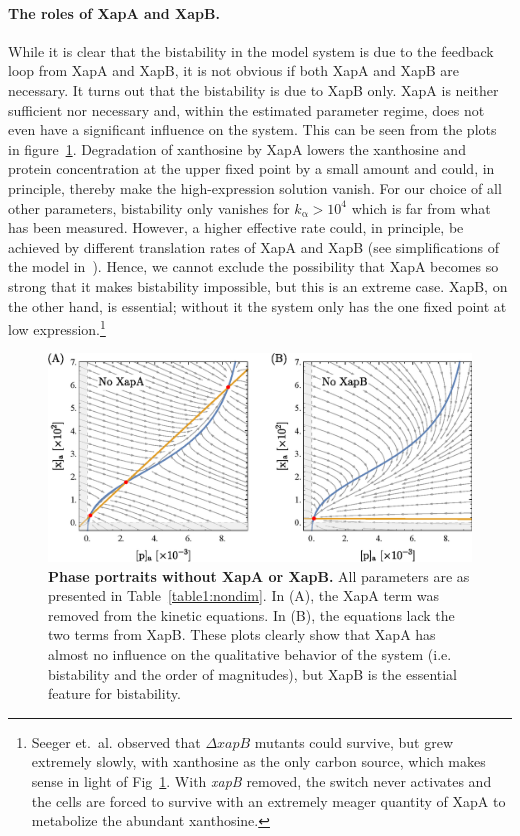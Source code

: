 \documentclass[10pt,letterpaper]{article}
\newcommand{\n}[1]{\mathrm{#1}}
\begin{document}
	\paragraph*{The roles of XapA and XapB.}
	While it is clear that the bistability in the model system is due to the
	feedback loop from XapA and XapB, it is not obvious if both XapA and XapB
	are necessary. It turns out that the bistability is due to XapB only. XapA
	is neither sufficient nor necessary and, within the estimated parameter
	regime, does not even have a significant influence on the system. This can
	be seen from the plots in figure~\ref{fig6:xapAB}.
	Degradation of xanthosine by XapA lowers the xanthosine and protein concentration at the upper
	fixed point by a small amount and could, in principle, thereby make the
	high-expression solution vanish. For our choice of all other parameters,
	bistability only vanishes for $k_{\n{\alpha}} > 10^4$ which is far from what has been
	measured. However, a higher effective rate could, in principle, be achieved by
	different translation rates of XapA and XapB (see simplifications of the
	model in~). Hence, we cannot exclude the possibility that
	XapA becomes so strong that it makes bistability impossible, but this is an
	extreme case. XapB, on the other hand, is essential; without it the system
	only has the one fixed point at low expression.\footnote{
		Seeger et.\ al.\cite{Seeger1995} observed that $\Delta xapB$ mutants could
		survive, but grew extremely slowly, with xanthosine as the only carbon
		source, which makes sense in light of Fig~\ref{fig6:xapAB}.
		With \textit{xapB} removed, the switch never activates and the cells are
		forced to survive with an extremely meager quantity of XapA to metabolize
		the abundant xanthosine.}
	
	\begin{figure}%
		\includegraphics{media/XapAB.eps}
		\centering
		\caption{{\bf Phase portraits without XapA or XapB.}
			All parameters are as presented in Table~\ref{table1:nondim}. In
			(A), the XapA term was removed from the kinetic equations. In (B),
			the equations lack the two terms from XapB. These plots clearly show
			that XapA has almost no influence on the qualitative behavior of the
			system (i.e. bistability and the order of magnitudes), but XapB is
			the essential feature for bistability.}
		\label{fig6:xapAB}
	\end{figure}
	
\end{document}
